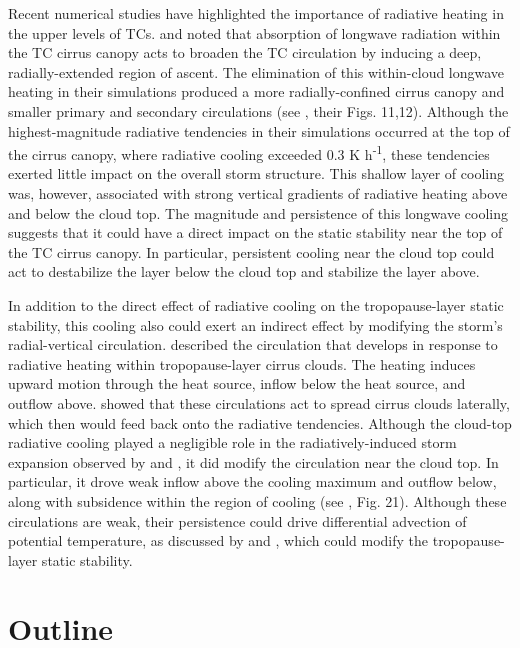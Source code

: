 Recent numerical studies have highlighted the importance of radiative heating in the upper levels of TCs.
\cite{Buetal2014} and \cite{Fovelletal2016} noted that absorption of longwave radiation within the TC cirrus canopy acts to broaden the TC circulation by inducing a deep, radially-extended region of ascent.
The elimination of this within-cloud longwave heating in their simulations produced a more radially-confined cirrus canopy and smaller primary and secondary circulations (see \citeauthor{Buetal2014} \citeyear{Buetal2014}, their Figs. 11,12).
Although the highest-magnitude radiative tendencies in their simulations occurred at the top of the cirrus canopy, where radiative cooling exceeded 0.3 K h\textsuperscript{-1}, these tendencies exerted little impact on the overall storm structure.
This shallow layer of cooling was, however, associated with strong vertical gradients of radiative heating above and below the cloud top.
The magnitude and persistence of this longwave cooling suggests that it could have a direct impact on the static stability near the top of the TC cirrus canopy.
In particular, persistent cooling near the cloud top could act to destabilize the layer below the cloud top and stabilize the layer above.

In addition to the direct effect of radiative cooling on the tropopause-layer static stability, this cooling also could exert an indirect effect by modifying the storm's radial-vertical circulation.
\cite{Durranetal2009} described the circulation that develops in response to radiative heating within tropopause-layer cirrus clouds.
The heating induces upward motion through the heat source, inflow below the heat source, and outflow above.
\cite{Dinhetal2010} showed that these circulations act to spread cirrus clouds laterally, which then would feed back onto the radiative tendencies.
Although the cloud-top radiative cooling played a negligible role in the radiatively-induced storm expansion observed by \cite{Buetal2014} and \cite{Fovelletal2016}, it did modify the circulation near the cloud top.
In particular, it drove weak inflow above the cooling maximum and outflow below, along with subsidence within the region of cooling (see \citeauthor{Fovelletal2016} \citeyear{Fovelletal2016}, Fig. 21).
Although these circulations are weak, their persistence could drive differential advection of potential temperature, as discussed by \cite{ChenZhang2013} and \cite{ChenGopalakrishnan2015},  which could modify the tropopause-layer static stability.

\section{Outline}


